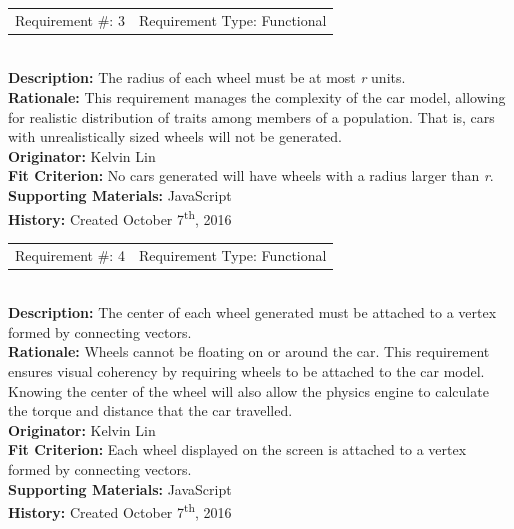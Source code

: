 \documentclass[12pt, titlepage]{article}
\begin{document}
\begin{reqbox}
	\begin{tabular}{cc}
		Requirement \#: 3 & Requirement Type: Functional \\
	\end{tabular} \\
	\textbf{Description:} The radius of each wheel must be at most \textit{r} 
units. 
	\\
	\textbf{Rationale:}  This requirement manages the complexity of the car model, 
	allowing for realistic distribution of traits among members of a population. 
	That is, cars with unrealistically sized wheels will not be generated.\\
	\textbf{Originator:} Kelvin Lin\\
	\textbf{Fit Criterion:} No cars generated will have wheels with a radius larger 
	than \textit{r}.\\
	\textbf{Supporting Materials:} JavaScript \\
	\textbf{History:} Created October 7\textsuperscript{th}, 2016
\end{reqbox}

\newpage

\begin{reqbox}
	\begin{tabular}{cc}
		Requirement \#: 4 & Requirement Type: Functional \\
	\end{tabular} \\
	\textbf{Description:} The center of each wheel generated must be attached to a 
	vertex formed by connecting vectors. \\
	\textbf{Rationale:}  Wheels cannot be floating on or around the car. This 
	requirement ensures visual coherency by requiring wheels to be attached to the 
	car model. Knowing the center of the wheel will also allow the physics engine 
to 
	calculate the torque and distance that the car travelled.\\
	\textbf{Originator:} Kelvin Lin\\
	\textbf{Fit Criterion:} Each wheel displayed on the screen is attached to a 
	vertex formed by connecting vectors.\\
	\textbf{Supporting Materials:} JavaScript \\
	\textbf{History:} Created October 7\textsuperscript{th}, 2016
\end{reqbox}
\end{document}
